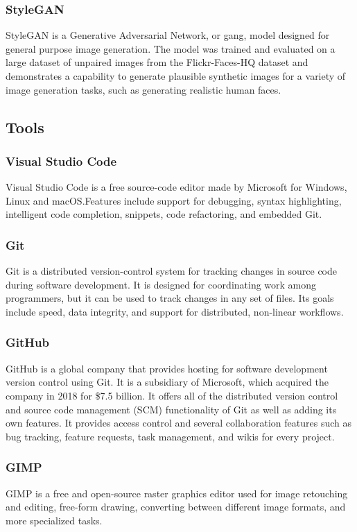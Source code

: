\subsubsection*{StyleGAN}\label{subsubsec:stylegan}
StyleGAN is a Generative Adversarial Network, or \gls{gang}, model designed for
general purpose image generation. The model was trained and evaluated on a large
dataset of unpaired images from the Flickr-Faces-HQ dataset and demonstrates a
capability to generate plausible synthetic images for a variety of image
generation tasks, such as generating realistic human faces.

\subsection*{Tools}\label{subsec:tools}
\subsubsection*{Visual Studio Code}\label{subsubsec:vscode}
Visual Studio Code is a free source-code editor made by Microsoft for Windows,
Linux and macOS.\@ Features include support for debugging, syntax highlighting,
intelligent code completion, snippets, code refactoring, and embedded Git.
\subsubsection*{Git}\label{subsubsec:git}
Git is a distributed version-control system for tracking changes in source code
during software development. It is designed for coordinating work among
programmers, but it can be used to track changes in any set of files. Its goals
include speed, data integrity, and support for distributed, non-linear
workflows.
\subsubsection*{GitHub}\label{subsubsec:github}
GitHub is a global company that provides hosting for software development
version control using Git. It is a subsidiary of Microsoft, which acquired the
company in 2018 for \$7.5 billion. It offers all of the distributed version
control and source code management (SCM) functionality of Git as well as adding
its own features. It provides access control and several collaboration features
such as bug tracking, feature requests, task management, and wikis for every
project.
\subsubsection*{GIMP}\label{subsubsec:gimp}
GIMP is a free and open-source raster graphics editor used for image retouching
and editing, free-form drawing, converting between different image formats, and
more specialized tasks.
